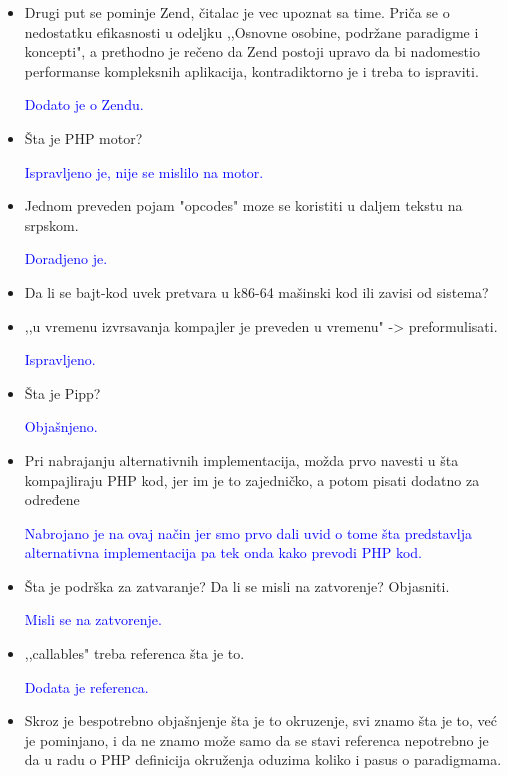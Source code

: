 \documentclass[a4paper]{report}
\newcommand{\odgovor}[1]{\textcolor{blue}{#1}}
\begin{document}
\begin{itemize}
\item Drugi put se pominje Zend, čitalac je vec upoznat sa time. Priča se o nedostatku efikasnosti u odeljku ,,Osnovne osobine, podržane paradigme i koncepti", a prethodno je rečeno da Zend postoji upravo da bi nadomestio performanse kompleksnih aplikacija, kontradiktorno je i treba to ispraviti.

\odgovor{Dodato je o Zendu.}

\item Šta je PHP motor?

\odgovor{Ispravljeno je, nije se mislilo na motor.}

\item Jednom preveden pojam "opcodes" moze se koristiti u daljem tekstu na srpskom.

\odgovor{Doradjeno je.}

\item Da li se bajt-kod uvek pretvara u k86-64 mašinski kod ili zavisi od sistema?

\odgovor{}

\item ,,u vremenu izvrsavanja kompajler je preveden u vremenu" -> preformulisati.

\odgovor{Ispravljeno.}

\item Šta je Pipp?

\odgovor{Objašnjeno.}

\item Pri nabrajanju alternativnih implementacija, možda prvo navesti u šta kompajliraju PHP kod, jer im je to zajedničko, a potom pisati dodatno za određene

\odgovor{Nabrojano je na ovaj način jer smo prvo dali uvid o tome šta predstavlja alternativna implementacija pa tek onda kako prevodi PHP kod.}

\item Šta je podrška za zatvaranje? Da li se misli na zatvorenje? Objasniti.

\odgovor{Misli se na zatvorenje.}

\item ,,callables" treba referenca šta je to.

\odgovor{Dodata je referenca.}

\item Skroz je bespotrebno objašnjenje šta je to okruzenje, svi znamo šta je to, već je pominjano, i da ne znamo može samo da se stavi referenca nepotrebno je da u radu o PHP definicija okruženja oduzima koliko i pasus o paradigmama.


\end{itemize}
\end{document}
